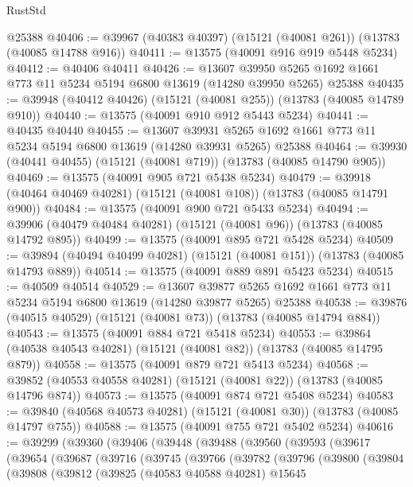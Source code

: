 \begin{lexlean}{RustStd}
\begin{coremodule}
    @25388
@40406 := @39967 (@40383 @40397) (@15121 (@40081 @261)) (@13783 (@40085 @14788 @916))
@40411 := @13575 (@40091 @916 @919 @5448 @5234)
@40412 := @40406 @40411
@40426 := @13607
    @39950
    @5265
    @1692
    @1661
    @773
    @11
    @5234
    @5194
    @6800
    @13619
    (@14280 @39950 @5265)
    @25388
@40435 := @39948 (@40412 @40426) (@15121 (@40081 @255)) (@13783 (@40085 @14789 @910))
@40440 := @13575 (@40091 @910 @912 @5443 @5234)
@40441 := @40435 @40440
@40455 := @13607
    @39931
    @5265
    @1692
    @1661
    @773
    @11
    @5234
    @5194
    @6800
    @13619
    (@14280 @39931 @5265)
    @25388
@40464 := @39930 (@40441 @40455) (@15121 (@40081 @719)) (@13783 (@40085 @14790 @905))
@40469 := @13575 (@40091 @905 @721 @5438 @5234)
@40479 := @39918 (@40464 @40469 @40281) (@15121 (@40081 @108)) (@13783 (@40085 @14791 @900))
@40484 := @13575 (@40091 @900 @721 @5433 @5234)
@40494 := @39906 (@40479 @40484 @40281) (@15121 (@40081 @96)) (@13783 (@40085 @14792 @895))
@40499 := @13575 (@40091 @895 @721 @5428 @5234)
@40509 := @39894 (@40494 @40499 @40281) (@15121 (@40081 @151)) (@13783 (@40085 @14793 @889))
@40514 := @13575 (@40091 @889 @891 @5423 @5234)
@40515 := @40509 @40514
@40529 := @13607
    @39877
    @5265
    @1692
    @1661
    @773
    @11
    @5234
    @5194
    @6800
    @13619
    (@14280 @39877 @5265)
    @25388
@40538 := @39876 (@40515 @40529) (@15121 (@40081 @73)) (@13783 (@40085 @14794 @884))
@40543 := @13575 (@40091 @884 @721 @5418 @5234)
@40553 := @39864 (@40538 @40543 @40281) (@15121 (@40081 @82)) (@13783 (@40085 @14795 @879))
@40558 := @13575 (@40091 @879 @721 @5413 @5234)
@40568 := @39852 (@40553 @40558 @40281) (@15121 (@40081 @22)) (@13783 (@40085 @14796 @874))
@40573 := @13575 (@40091 @874 @721 @5408 @5234)
@40583 := @39840 (@40568 @40573 @40281) (@15121 (@40081 @30)) (@13783 (@40085 @14797 @755))
@40588 := @13575 (@40091 @755 @721 @5402 @5234)
@40616 := @39299
    (@39360
      (@39406
        (@39448
          (@39488
            (@39560
              (@39593
                (@39617
                  (@39654
                    (@39687
                      (@39716
                        (@39745
                          (@39766
                            (@39782
                              (@39796
                                (@39800
                                  (@39804
                                    (@39808
                                      (@39812
                                        (@39825
                                          (@40583 @40588 @40281)
                                          @15645

\end{coremodule}
\end{lexlean}
